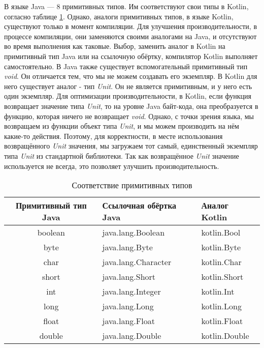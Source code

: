 В языке Java --- 8 примитивных типов. Им соответствуют свои типы в Kotlin, согласно таблице \ref{tab:primitiveKotlinVsJava}. Однако, аналоги примитивных типов, в языке Kotlin, существуют только в момент компиляции. Для улучшения производительности, в процессе компиляции, они заменяются своими аналогами на Java, и отсутствуют во время выполнения как таковые. Выбор, заменить аналог в Kotlin на примитивный тип Java или на ссылочную обёртку, компилятор Kotlin выполняет самостоятельно.
В Java также существует вспомогательный примитивный тип \textit{void}. Он отличается тем, что мы не можем создавать его экземпляр. В Kotlin для него существует аналог - тип \textit{Unit}. Он не является примитивным, и у него есть один экземпляр. Для оптимизации производительности, в Kotlin, если функция возвращает значение типа \textit{Unit}, то на уровне Java байт-кода, она преобразуется в функцию, которая ничего не возвращает \textit{void}. Однако, с точки зрения языка, мы возвращаем из функции объект типа \textit{Unit}, и мы можем производить на нём какие-то действия. Поэтому, для корректности, в месте использования возвращённого \textit{Unit} значения, мы загружаем тот самый, единственный экземпляр типа \textit{Unit} из стандартной библиотеки. Так как возвращённое \textit{Unit} значение используется не всегда, это позволяет улучшить производительность.



\begin{table}[h]
\caption{\label{tab:primitiveKotlinVsJava}Соответствие примитивных типов}
\begin{center}
\begin{tabular}{|c|l|l|}
\hline
Примитивный тип Java & Ссылочная обёртка Java & Аналог Kotlin \\
\hline
boolean  & java.lang.Boolean  & kotlin.Bool  \\
byte  & java.lang.Byte & kotlin.Byte \\
char  & java.lang.Character & kotlin.Char \\
short  & java.lang.Short & kotlin.Short \\
int & java.lang.Integer & kotlin.Int \\
long &  java.lang.Long & kotlin.Long \\
float & java.lang.Float & kotlin.Float \\
double & java.lang.Double & kotlin.Double \\
\hline
\end{tabular}
\end{center}
\end{table}



